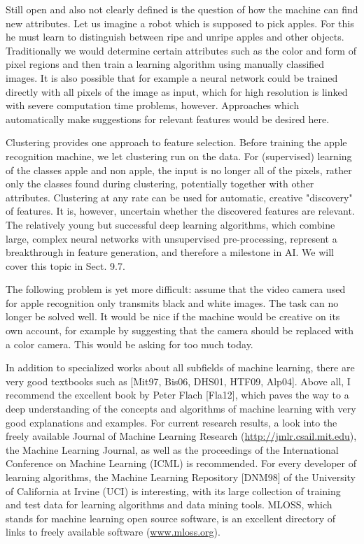 \documentclass[10pt]{article}
\begin{document}
Still open and also not clearly defined is the question of how the machine can find new attributes. Let us imagine a robot which is supposed to pick apples. For this he must learn to distinguish between ripe and unripe apples and other objects. Traditionally we would determine certain attributes such as the color and form of pixel regions and then train a learning algorithm using manually classified images. It is also possible that for example a neural network could be trained directly with all pixels of the image as input, which for high resolution is linked with severe computation time problems, however. Approaches which automatically make suggestions for relevant features would be desired here.

Clustering provides one approach to feature selection. Before training the apple recognition machine, we let clustering run on the data. For (supervised) learning of the classes apple and non apple, the input is no longer all of the pixels, rather only the classes found during clustering, potentially together with other attributes. Clustering at any rate can be used for automatic, creative "discovery" of features. It is, however, uncertain whether the discovered features are relevant. The relatively young but successful deep learning algorithms, which combine large, complex neural networks with unsupervised pre-processing, represent a breakthrough in feature generation, and therefore a milestone in AI. We will cover this topic in Sect. 9.7.

The following problem is yet more difficult: assume that the video camera used for apple recognition only transmits black and white images. The task can no longer be solved well. It would be nice if the machine would be creative on its own account, for example by suggesting that the camera should be replaced with a color camera. This would be asking for too much today.

In addition to specialized works about all subfields of machine learning, there are very good textbooks such as [Mit97, Bis06, DHS01, HTF09, Alp04]. Above all, I recommend the excellent book by Peter Flach [Fla12], which paves the way to a deep understanding of the concepts and algorithms of machine learning with very good explanations and examples. For current research results, a look into the freely available Journal of Machine Learning Research (\href{http://jmlr.csail.mit.edu}{http://jmlr.csail.mit.edu}), the Machine Learning Journal, as well as the proceedings of the International Conference on Machine Learning (ICML) is recommended. For every developer of learning algorithms, the Machine Learning Repository [DNM98] of the University of California at Irvine (UCI) is interesting, with its large collection of training and test data for learning algorithms and data mining tools. MLOSS, which stands for machine learning open source software, is an excellent directory of links to freely available software (\href{http://www.mloss.org}{www.mloss.org}).
\end{document}
